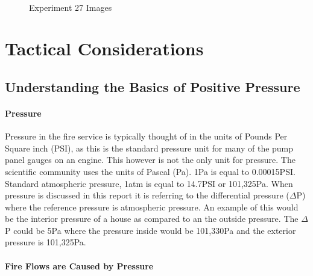 \documentclass{article}
\begin{document}
\begin{figure}[H]
	\ContinuedFloat 
	\centering 
	 \ 
	\caption{Experiment 27 Images}
	\label{fig:Experiment31ImagesCont4} 
\end{figure}

\clearpage

\section{Tactical Considerations}

\subsection{Understanding the Basics of Positive Pressure}

\paragraph{Pressure} \mbox{}

Pressure in the fire service is typically thought of in the units of Pounds Per Square inch (PSI), as this is the standard pressure unit for many of the pump panel gauges on an engine. This however is not the only unit for pressure. The scientific community uses the units of Pascal (Pa).  1Pa is equal to 0.00015PSI. Standard atmospheric pressure, 1atm  is equal to 14.7PSI or 101,325Pa. When pressure is discussed in this report it is referring to the differential pressure ($\Delta$P) where the reference pressure is atmospheric pressure. An example of this would be the interior pressure of a house as compared to an the outside pressure. The $\Delta$P could be 5Pa where the pressure inside would be 101,330Pa and the exterior pressure is 101,325Pa.  

\paragraph{Fire Flows are Caused by Pressure} \mbox{}
\end{document}
